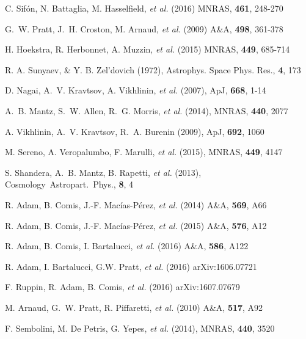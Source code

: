 \documentclass[11pt,a4paper,twoside,graphicx,color]{article}
\begin{document}
\begin{thebibliography}{9}

C. Sif{\'o}n, N. Battaglia,  M. Hasselfield, {\it et al.} (2016) MNRAS, \textbf{461}, 248-270

G.~W. Pratt, J.~H. Croston,  M. Arnaud, {\it et al.} (2009) A\&A, \textbf{498}, 361-378

H. Hoekstra, R. Herbonnet,  A. Muzzin, {\it et al.} (2015) MNRAS, \textbf{449}, 685-714

  R. A. Sunyaev, \& Y. B. Zel'dovich (1972), Astrophys. Space Phys. Res., \textbf{4}, 173
  
  D. Nagai, A.~V. Kravtsov, A. Vikhlinin, {\it et al.} (2007), ApJ, \textbf{668}, 1-14
  
  A.~B. Mantz, S.~W. Allen, R.~G. Morris, {\it et al.} (2014), MNRAS, \textbf{440}, 2077
  
  A. Vikhlinin, A.~V. Kravtsov, R.~A. Burenin (2009), ApJ, \textbf{692}, 1060
  
  M. Sereno, A. Veropalumbo, F. Marulli, {\it et al.} (2015), MNRAS, \textbf{449}, 4147
  
  S. Shandera, A.~B. Mantz, B. Rapetti, {\it et al.} (2013), Cosmology~Astropart.~Phys., \textbf{8}, 4
  
R. Adam, B. Comis, J.-F. Mac\'ias-P\'erez, {\it et al.} (2014) A\&A, \textbf{569}, A66

R. Adam, B. Comis, J.-F. Mac\'ias-P\'erez, {\it et al.} (2015) A\&A, \textbf{576}, A12

R. Adam, B. Comis, I. Bartalucci, {\it et al.} (2016) A\&A, \textbf{586}, A122

R. Adam, I. Bartalucci, G.W. Pratt, {\it et al.} (2016) arXiv:1606.07721

F. Ruppin, R. Adam, B. Comis, {\it et al.} (2016) arXiv:1607.07679

M. Arnaud, G.~W. Pratt, R. Piffaretti, {\it et al.} (2010) A\&A, \textbf{517}, A92

  F. Sembolini, M. De Petris, G. Yepes, {\it et al.} (2014), MNRAS, \textbf{440}, 3520
  
\end{thebibliography}
\end{document}
